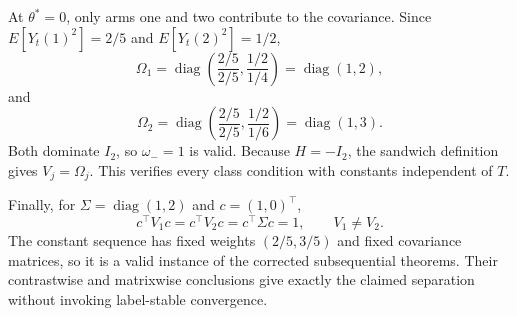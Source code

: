 At \(\theta^*=0\), only arms one and two contribute to the covariance. Since \(E[Y_t(1)^2]=2/5\) and \(E[Y_t(2)^2]=1/2\),
\[
 \Omega_1=\operatorname{diag}\left(\frac{2/5}{2/5},\frac{1/2}{1/4}\right)
 =\operatorname{diag}(1,2),
\]
and
\[
 \Omega_2=\operatorname{diag}\left(\frac{2/5}{2/5},\frac{1/2}{1/6}\right)
 =\operatorname{diag}(1,3).
\]
Both dominate \(I_2\), so \(\omega_-=1\) is valid. Because \(H=-I_2\), the sandwich definition gives \(V_j=\Omega_j\). This verifies every class condition with constants independent of \(T\).

Finally, for \(\Sigma=\operatorname{diag}(1,2)\) and \(c=(1,0)^\top\),
\[
 c^\top V_1c=c^\top V_2c=c^\top\Sigma c=1,
 \qquad V_1\ne V_2.
\]
The constant sequence has fixed weights \((2/5,3/5)\) and fixed covariance matrices, so it is a valid instance of the corrected subsequential theorems. Their contrastwise and matrixwise conclusions give exactly the claimed separation without invoking label-stable convergence.
